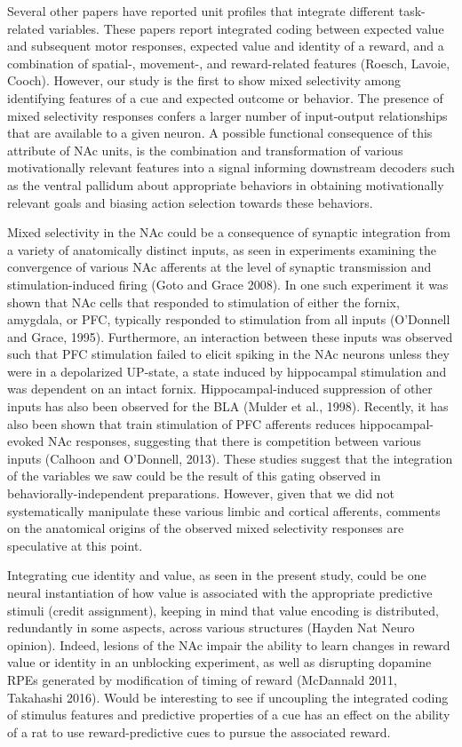 \documentclass[11pt]{article}
\providecommand{\DIFadd}[1]{{\protect\color{blue}\uwave{#1}}} %
\providecommand{\DIFaddbegin}{} %
\providecommand{\DIFaddend}{} %
\newcommand{\DIFaddincludegraphics}[2][]{{\color{blue}\fbox{\DIFOincludegraphics[#1]{#2}}}} %
\DeclareRobustCommand{\DIFaddbegin}{\DIFOaddbegin \let\includegraphics\DIFaddincludegraphics} %
\DeclareRobustCommand{\DIFaddend}{\DIFOaddend \let\includegraphics\DIFOincludegraphics} %
\begin{document}
Several other papers have reported unit profiles that integrate different task-related variables. These papers report integrated coding between expected value and subsequent motor responses, expected value and identity of a reward, and a combination of spatial-, movement-, and reward-related features (Roesch, Lavoie, Cooch). However, our study is the first to show mixed selectivity among identifying features of a cue and expected outcome or behavior. The presence of mixed selectivity responses confers a larger number of input-output relationships that are available to a given neuron. A possible functional consequence of this attribute of NAc units, is the combination and transformation of various motivationally relevant features into a signal informing downstream decoders such as the ventral pallidum about appropriate behaviors in obtaining motivationally relevant goals and biasing action selection towards these behaviors. 
\DIFaddbegin 

\DIFaddend Mixed selectivity in the NAc could be a consequence of synaptic integration from a variety of anatomically distinct inputs, as seen in experiments examining the convergence of various NAc afferents at the level of synaptic transmission and stimulation-induced firing (Goto and Grace 2008). In one such experiment it was shown that NAc cells that responded to stimulation of either the fornix, amygdala, or PFC, typically responded to stimulation from all inputs (O’Donnell and Grace, 1995). Furthermore, an interaction between these inputs was observed such that PFC stimulation failed to elicit spiking in the NAc neurons unless they were in a depolarized UP-state, a state induced by hippocampal stimulation and was dependent on an intact fornix. Hippocampal-induced suppression of other inputs has also been observed for the BLA (Mulder et al., 1998). Recently, it has also been shown that train stimulation of PFC afferents reduces hippocampal-evoked NAc responses, suggesting that there is competition between various inputs (Calhoon and O’Donnell, 2013). These studies suggest that the integration of the variables we saw could be the result of this gating observed in behaviorally-independent preparations. However, given that we did not systematically manipulate these various limbic and cortical afferents, comments on the anatomical origins of the observed mixed selectivity responses are speculative at this point.

Integrating cue identity and value, as seen \DIFaddbegin \DIFadd{modestly }\DIFaddend in the present study, could be one neural instantiation of how value is associated with the appropriate predictive stimuli (credit assignment), keeping in mind that value encoding is distributed, redundantly in some aspects, across various structures (Hayden Nat Neuro opinion). Indeed, lesions of the NAc impair the ability to learn changes in reward value or identity in an unblocking experiment, as well as disrupting dopamine RPEs generated by modification of timing of reward (McDannald 2011, Takahashi 2016). Would be interesting to see if uncoupling the integrated coding of stimulus features and predictive properties of a cue has an effect on the ability of a rat to use reward-predictive cues to pursue the associated reward.
\end{document}
